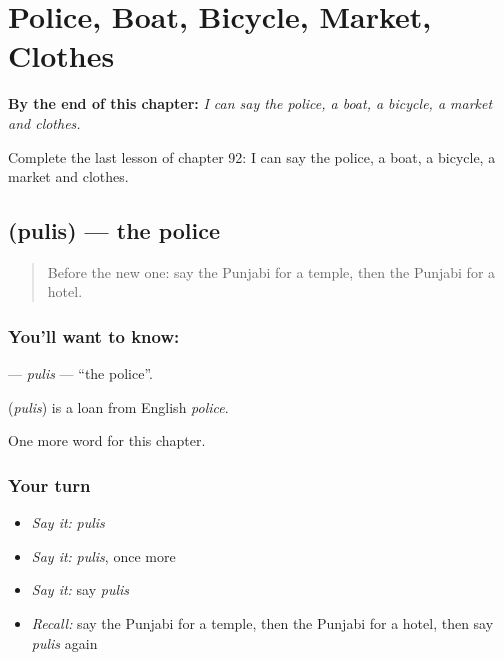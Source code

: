 
\chapter{Police, Boat, Bicycle, Market, Clothes}
\label{ch:pa-police-boat-bicycle-market-clothes}

\begin{chapteropening}
\textbf{By the end of this chapter:} \emph{I can say the police, a boat, a bicycle, a market and clothes.}

Complete the last lesson of chapter 92: I can say the police, a boat, a bicycle, a market and clothes.
\end{chapteropening}

\section[\texorpdfstring{\pa{ਪੁਲਿਸ} (pulis)}{ਪੁਲਿਸ (pulis)}]{ (pulis) — the police}

\label{lesson:PA-C92-pulis}



\begin{quote}
Before the new one: say the Punjabi for a temple, then the Punjabi for a hotel.
\end{quote}

\subsection*{You'll want to know: }
\textbf{} — \emph{pulis} — \textquotedblleft{}the police\textquotedblright{}.

\begin{cousinweb}
\textbf{} (\emph{pulis}) is a loan from English \emph{police}.
\end{cousinweb}

\begin{grammarlens}[title={What you've built}]
One more word for this chapter.
\end{grammarlens}

\subsection*{Your turn}
\begin{itemize}
\raggedright
  \item \emph{Say it:} \emph{pulis}
  \item \emph{Say it:} \emph{pulis}, once more
  \item \emph{Say it:} say \emph{pulis}
  \item \emph{Recall:} say the Punjabi for a temple, then the Punjabi for a hotel, then say \emph{pulis} again
\end{itemize}

